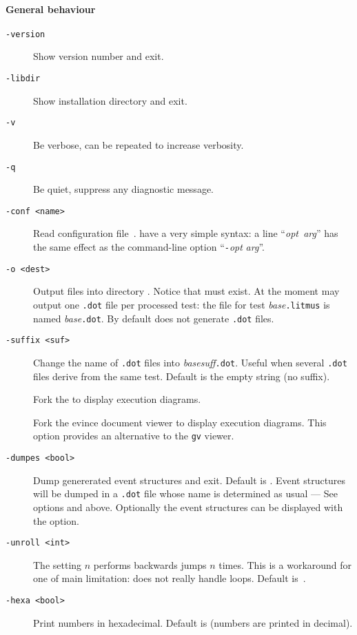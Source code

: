 \paragraph*{General behaviour}
\begin{description}
\item[{\tt -version}] Show version number and exit.
\item[{\tt -libdir}] Show installation directory and exit.
\item[{\tt -v}] Be verbose, can be repeated to increase verbosity.
\item[{\tt -q}] Be quiet, suppress any diagnostic message.
\item[{\tt -conf <name>}] Read configuration file~.
 have a very simple syntax:
a line ``\textit{opt}\texttt{  }\textit{arg}'' has the same effect as
the command-line option ``\texttt{-}\textit{opt} \textit{arg}''.
\item[{\tt -o <dest>}] Output files into directory .
Notice that  must exist.
At the moment \herd{} may output one \texttt{.dot} file per processed test:
the file for test \textit{base}\texttt{.litmus}
is named  \textit{base}\texttt{.dot}.
By default \herd{} does not generate \texttt{.dot} files.
\item[{\tt -suffix <suf>}] Change the name of \texttt{.dot} files
into \textit{base}\textit{suff}\texttt{.dot}. Useful when several \texttt{.dot} files derive from the same test. Default is the empty string (no suffix).
\item[{\tt {}}] Fork the  to display execution diagrams.
\item[{\tt {}}] Fork the evince document viewer to display execution diagrams. This option provides an alternative to the
{\tt gv} viewer.
\item[{\tt -dumpes <bool>}]
Dump genererated event structures and exit. Default is .
Event structures will be dumped in a \texttt{.dot} file whose
name is determined as usual --- See options  and  above.
Optionally the event structures can be displayed with the  option.
\item[{\tt -unroll <int>}] The setting $n$ performs backwards
jumps $n$ times. This is a workaround for one of \herd{} main limitation:
\herd{} does not really handle loops. Default is~.
\item[{\tt -hexa <bool>}] Print numbers in hexadecimal. Default is 
(numbers are printed in decimal).
\end{description}

